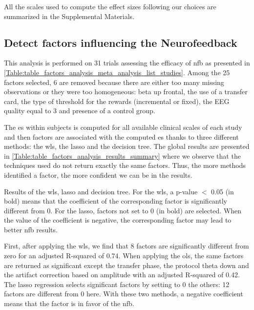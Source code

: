 All the scales used to compute the effect sizes following our choices are summarized in the Supplemental Materials.

\subsection{Detect factors influencing the Neurofeedback}

This analysis is performed on 31 trials assessing the efficacy of \gls{nfb} as presented in \cref{Table:table_factors_analysis_meta_analysis_list_studies}. 
Among the 25 factors selected, 6 are removed because there are either too many missing observations or they were too homogeneous: beta up frontal, 
the use of a transfer card, the type of threshold for the rewards (incremental or fixed), the EEG quality equal to 3 and presence of a control group. 

The \gls{es} within subjects is computed for all available clinical scales of each study and then factors are associated with the computed \gls{es}
thanks to three different methods: the \gls{wls}, the \gls{lasso} and the decision tree. The global results are presented in \cref{Table:table_factors_analysis_results_summary}
where we observe that the techniques used do not return exactly the same factors. Thus, the more methods identified a factor, the more confident we can be in
the results.  

\begin{table}[h!]
  \centering
  \caption{Results of the \gls{wls}, \gls{lasso} and decision tree. For the \gls{wls}, a p-value $<$ 0.05 (in bold) means that the coefficient of 
	the corresponding factor is significantly different from 0. For the \gls{lasso}, factors not set to 0 (in bold) are selected. 
	When the value of the coefficient is negative, the corresponding factor may lead to better \gls{nfb} results.}
  
  \label{Table:table_factors_analysis_results_summary}
\end{table}

First, after applying the \gls{wls}, we find that 8 factors are significantly different from zero for an adjusted R-squared of 0.74. 
When applying the \gls{ols}, the same factors are returned as significant except the transfer phase, the protocol theta down and the artifact correction
based on amplitude with an adjusted R-squared of 0.42. The \gls{lasso} regression selects significant factors by setting to 0 the others: 12 factors 
are different from 0 here. With these two methods, a negative coefficient means that the factor is in favor of the \gls{nfb}.

